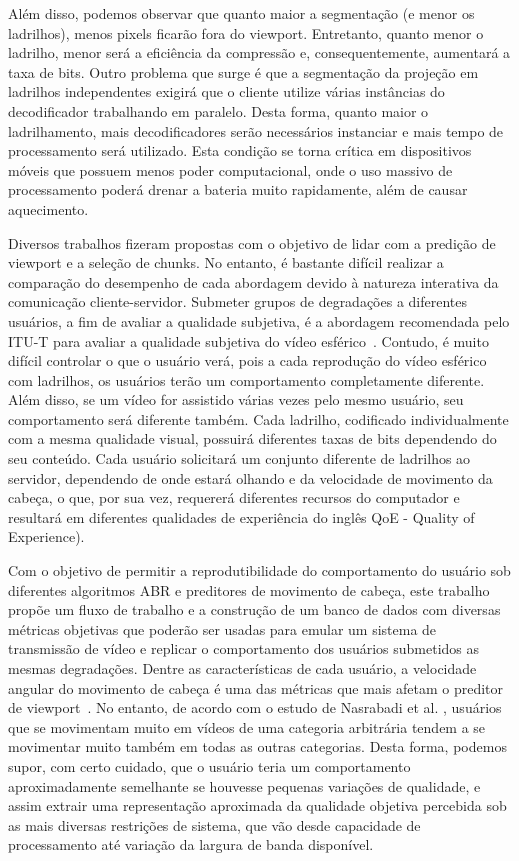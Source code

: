 Além disso, podemos observar que quanto maior a segmentação (e menor os ladrilhos), menos pixels ficarão fora do viewport. Entretanto, quanto menor o ladrilho, menor será a eficiência da compressão e, consequentemente, aumentará a taxa de bits. Outro problema que surge é que a segmentação da projeção em ladrilhos independentes exigirá que o cliente utilize várias instâncias do decodificador trabalhando em paralelo. Desta forma, quanto maior o ladrilhamento, mais decodificadores serão necessários instanciar e mais tempo de processamento será utilizado. Esta condição se torna crítica em dispositivos móveis que possuem menos poder computacional, onde o uso massivo de processamento poderá drenar a bateria muito rapidamente, além de causar aquecimento.

Diversos trabalhos fizeram propostas com o objetivo de lidar com a predição de viewport e a seleção de chunks. No entanto, é bastante difícil realizar a comparação do desempenho de cada abordagem devido à natureza interativa da comunicação cliente-servidor. Submeter grupos de degradações a diferentes usuários, a fim de avaliar a qualidade subjetiva, é a abordagem recomendada pelo ITU-T para avaliar a qualidade subjetiva do vídeo esférico~\cite{ITU-T2018}. Contudo, é muito difícil controlar o que o usuário verá, pois a cada reprodução do vídeo esférico com ladrilhos, os usuários terão um comportamento completamente diferente. Além disso, se um vídeo for assistido várias vezes pelo mesmo usuário, seu comportamento será diferente também. Cada ladrilho, codificado individualmente com a mesma qualidade visual, possuirá diferentes taxas de bits dependendo do seu conteúdo. Cada usuário solicitará um conjunto diferente de ladrilhos ao servidor, dependendo de onde estará olhando e da velocidade de movimento da cabeça, o que, por sua vez, requererá diferentes recursos do computador e resultará em diferentes qualidades de experiência do inglês QoE - Quality of Experience).

Com o objetivo de permitir a reprodutibilidade do comportamento do usuário sob diferentes algoritmos ABR e preditores de movimento de cabeça, este trabalho propõe um fluxo de trabalho e a construção de um banco de dados com diversas métricas objetivas que poderão ser usadas para emular um sistema de transmissão de vídeo e replicar o comportamento dos usuários submetidos as mesmas degradações. Dentre as características de cada usuário, a velocidade angular do movimento de cabeça é uma das métricas que mais afetam o preditor de viewport~\cite{Qian2016}. No entanto, de acordo com o estudo de Nasrabadi et al. \cite{Nasrabadi2019}, usuários que se movimentam muito em vídeos de uma categoria arbitrária tendem a se movimentar muito também em todas as outras categorias. Desta forma, podemos supor, com certo cuidado, que o usuário teria um comportamento aproximadamente semelhante se houvesse pequenas variações de qualidade, e assim extrair uma representação aproximada da qualidade objetiva percebida sob as mais diversas restrições de sistema, que vão desde capacidade de processamento até variação da largura de banda disponível.

